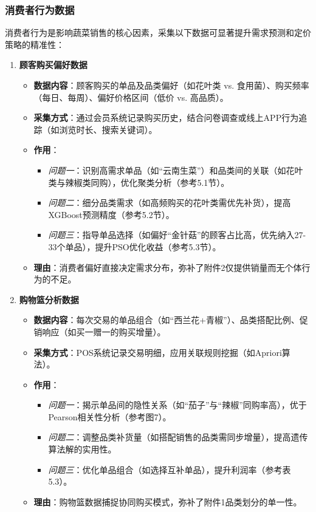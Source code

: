 \documentclass{cumcmthesis} %
\begin{document}
\subsubsection{消费者行为数据}

消费者行为是影响蔬菜销售的核心因素，采集以下数据可显著提升需求预测和定价策略的精准性：

\begin{enumerate}
\item \textbf{顾客购买偏好数据}
\begin{itemize}
\item \textbf{数据内容}：顾客购买的单品及品类偏好（如花叶类 vs. 食用菌）、购买频率（每日、每周）、偏好价格区间（低价 vs. 高品质）。
\item \textbf{采集方式}：通过会员系统记录购买历史，结合问卷调查或线上APP行为追踪（如浏览时长、搜索关键词）。
\item \textbf{作用}：
\begin{itemize}
\item \textit{问题一}：识别高需求单品（如“云南生菜”）和品类间的关联（如花叶类与辣椒类同购），优化聚类分析（参考5.1节）。
\item \textit{问题二}：细分品类需求（如高频购买的花叶类需优先补货），提高XGBoost预测精度（参考5.2节）。
\item \textit{问题三}：指导单品选择（如偏好“金针菇”的顾客占比高，优先纳入27-33个单品），提升PSO优化收益（参考5.3节）。
\end{itemize}
\item \textbf{理由}：消费者偏好直接决定需求分布，弥补了附件2仅提供销量而无个体行为的不足。
\end{itemize}

\item \textbf{购物篮分析数据}
\begin{itemize}
\item \textbf{数据内容}：每次交易的单品组合（如“西兰花+青椒”）、品类搭配比例、促销响应（如买一赠一的购买增量）。
\item \textbf{采集方式}：POS系统记录交易明细，应用关联规则挖掘（如Apriori算法）。
\item \textbf{作用}：
\begin{itemize}
\item \textit{问题一}：揭示单品间的隐性关系（如“茄子”与“辣椒”同购率高），优于Pearson相关性分析（参考图7）。
\item \textit{问题二}：调整品类补货量（如搭配销售的品类需同步增量），提高遗传算法解的实用性。
\item \textit{问题三}：优化单品组合（如选择互补单品），提升利润率（参考表5.3）。
\end{itemize}
\item \textbf{理由}：购物篮数据捕捉协同购买模式，弥补了附件1品类划分的单一性。
\end{itemize}


\end{enumerate}
\end{document}
